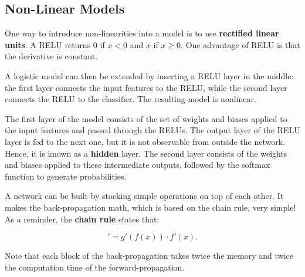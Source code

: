 \subsection{Non-Linear Models}

One way to introduce non-linearities into a model is to use \textbf{rectified linear units}. A RELU returns 0 if $x<0$ and $x$ if $x \geq 0$. One advantage of RELU is that the derivative is constant.

A logistic model can then be extended by inserting a RELU layer in the middle: the first layer connects the input features to the RELU, while the second layer connects the RELU to the classifier. The resulting model is nonlinear. 

The first layer of the model consists of the set of weights and biases applied to the input features and passed through the RELUs. The output layer of the RELU layer is fed to the next one, but it is not observable from outside the network. Hence, it is known as a \textbf{hidden} layer. The second layer consists of the weights and biases applied to these intermediate outputs, followed by the softmax function to generate probabilities. 

A network can be built by stacking simple operations on top of each other. It makes the back-propagation math, which is based on the chain rule, very simple! As a reminder, the \textbf{chain rule} states that:

\begin{equation}
	[g(f(x))]' = g'(f(x)) \cdot f'(x).
\end{equation}

Note that each block of the back-propagation takes twice the memory and twice the computation time of the forward-propagation. 


